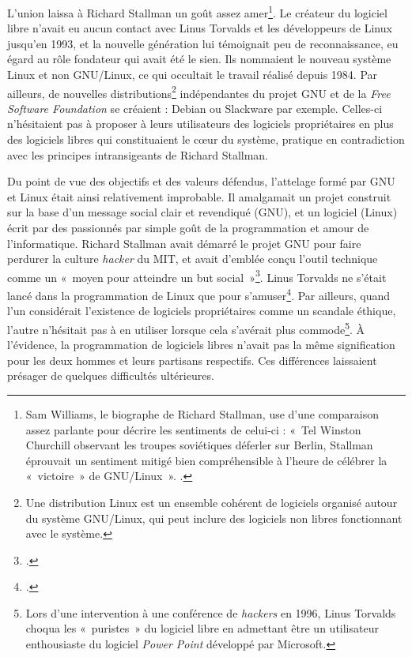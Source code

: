 \documentclass{FramateX}
\begin{document}
\begin{refsection}
L'union laissa à Richard Stallman un goût assez
amer\footnote{Sam Williams, le biographe de Richard Stallman, use
d'une comparaison assez parlante pour décrire les sentiments de
celui-ci : «~Tel Winston Churchill observant les troupes soviétiques
déferler sur Berlin, Stallman éprouvait un sentiment mitigé bien
compréhensible à l'heure de célébrer la «~victoire~» de GNU/Linux~».
 \cite[p.~205]{williamsrichard2010}.}. Le créateur du
logiciel libre n'avait eu aucun contact avec Linus Torvalds et les
développeurs de Linux jusqu'en 1993, et la nouvelle génération lui
témoignait peu de reconnaissance, eu égard au rôle fondateur qui avait
été le sien. Ils nommaient le nouveau système Linux et non GNU/Linux,
ce qui occultait le travail réalisé depuis 1984. Par ailleurs, de
nouvelles distributions\footnote{Une distribution Linux est un
ensemble cohérent de logiciels organisé autour du système GNU/Linux,
qui peut inclure des logiciels non libres fonctionnant avec le
système.} indépendantes du projet GNU et de la \textit{Free Software
Foundation} se créaient : Debian ou Slackware par exemple. Celles-ci
n'hésitaient pas à proposer à leurs utilisateurs des logiciels
propriétaires en plus des logiciels libres qui constituaient le cœur du
système, pratique en contradiction avec les principes intransigeants de
Richard Stallman. 

Du point de vue des objectifs et des valeurs défendus, l'attelage formé
par GNU et Linux était ainsi relativement improbable. Il amalgamait un
projet construit sur la base d'un message social clair et revendiqué
(GNU), et un logiciel (Linux) écrit par des passionnés par simple goût
de la programmation et amour de l'informatique. Richard Stallman avait
démarré le projet GNU pour faire perdurer la culture \textit{hacker} du
MIT, et avait d'emblée conçu l'outil technique comme un «~moyen pour
atteindre un but social~»\footnote{\cite{stallmanlecture1986}.}. Linus Torvalds ne
s'était lancé dans la programmation de Linux que pour
s'amuser\footnote{\cite{torvaldsjust2001}.}. Par ailleurs, quand l'un considérait
l'existence de logiciels propriétaires comme un scandale éthique,
l'autre n'hésitait pas à en utiliser lorsque cela s'avérait plus
commode\footnote{Lors d'une intervention à une conférence de
\textit{hackers} en 1996, Linus Torvalds choqua les «~puristes~» du
logiciel libre en admettant être un utilisateur enthousiaste du
logiciel \textit{Power Point} développé par Microsoft.}. À l'évidence,
la programmation de logiciels libres n'avait pas la même signification
pour les deux hommes et leurs partisans respectifs. Ces différences
laissaient présager de quelques difficultés ultérieures. 




\end{refsection}
\end{document}
